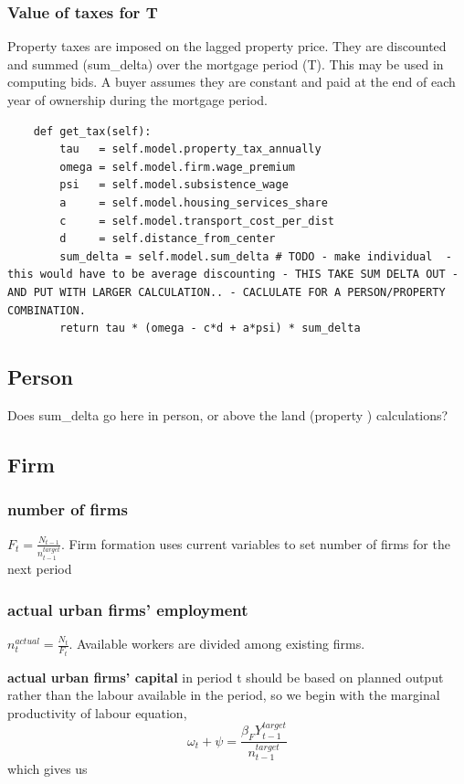 \subsubsection{Value of taxes for T}
Property taxes are imposed on the  lagged property price. They  are discounted and summed (sum\_delta)  over the mortgage period (T). This may be used in computing bids. A buyer assumes they are constant and paid at the end of each year of ownership during the mortgage period.
\begin{lstlisting}
    def get_tax(self):
        tau   = self.model.property_tax_annually
        omega = self.model.firm.wage_premium 
        psi   = self.model.subsistence_wage
        a     = self.model.housing_services_share
        c     = self.model.transport_cost_per_dist
        d     = self.distance_from_center
        sum_delta = self.model.sum_delta # TODO - make individual  - this would have to be average discounting - THIS TAKE SUM DELTA OUT - AND PUT WITH LARGER CALCULATION.. - CACLULATE FOR A PERSON/PROPERTY COMBINATION.
        return tau * (omega - c*d + a*psi) * sum_delta
\end{lstlisting}

\subsection{Person}
Does sum\_delta go here in person, or above the land (property ) calculations?  

\subsection{Firm}

\subsubsection{number of firms} $F_{t}=\frac{N_{t-1}}{n^{target}_{t-1}}$. Firm formation uses current variables to set number of firms for the next period 

\subsubsection{actual urban firms' employment} 
$n_t^{actual}= \frac{N_t}{F_t} $. Available workers are divided among existing firms.   


\textbf{actual urban firms' capital} in period t should be based on planned output rather than the labour available in the period, so we begin with the marginal productivity of labour equation, \[\omega_{t}+\psi = \frac{\beta_{F}Y^{target}_{t-1}}{n_{t-1}^{target}}\]
which gives us 


